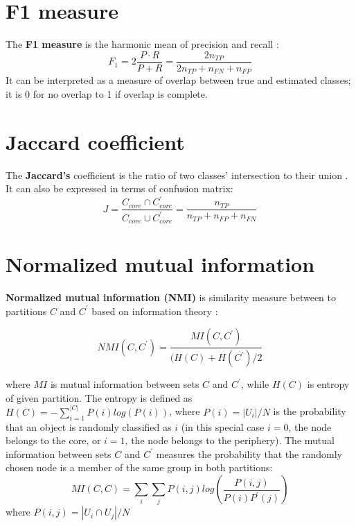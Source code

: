 \section{F1 measure}
The \textbf{F1 measure} is the harmonic mean of precision and recall \cite{labatut2012accuracy}:
\begin{equation}
F_1 = 2\frac{P \cdot R}{P+R} = \frac{2n_{TP}}{2n_{TP}+n_{FN} + n_{FP}}
\end{equation}
It can be interpreted as a measure of overlap between true and estimated classes; it is 0 for no overlap to 1 if overlap is complete.

\section{Jaccard coefficient}
The \textbf{Jaccard's} coefficient is the ratio of two classes' intersection to their union \cite{labatut2012accuracy}. It can also be expressed in terms of confusion matrix: 
\begin{equation}
J =  \frac{C_{core} \cap C^{'}_{core}}{C_{core} \cup C^{'}_{core}} =   \frac{n_{TP}}{n_{TP}+n_{FP} + n_{FN}}
\end{equation}

\section{Normalized mutual information}
\textbf{Normalized mutual information (NMI)} is similarity measure between to partitions $C$ and $C^{'}$  based on information theory \cite{danon2005comparing}:

\begin{equation}
NMI(C, C^{'}) = \frac{MI(C, C^{'})}{(H(C)+H(C^{'})/2}
\end{equation}

where $MI$ is mutual information between sets $C$ and $C^{'}$, while $H(C)$ is entropy of given partition. The entropy is defined as $H(C) = - \sum_{i=1}^{|C|}P(i)log(P(i))$, where $P(i) = |U_i|/N$ is the probability that an object is randomly classified as $i$ (in this special case $i=0$, the node belongs to the core, or $i=1$, the node belongs to the periphery). The mutual information between sets $C$ and $C^{'}$ measures the probability that the randomly chosen node is a member of the same group in both partitions:
\begin{equation}
MI(C, C) = \sum_i\sum_j P(i, j) log(\frac{P(i,j)}{P(i)P^{'}(j)})    
\end{equation}
where $P(i, j)= |U_i \cap U_j|/N$

